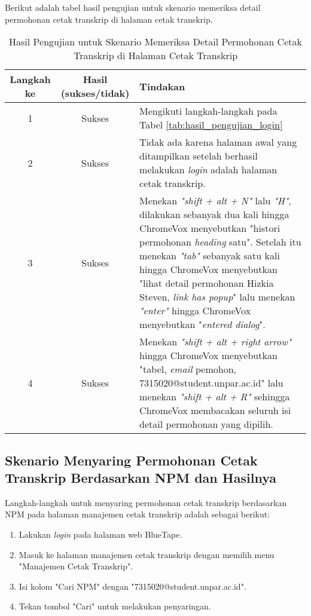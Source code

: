 Berikut adalah tabel hasil pengujian untuk skenario memeriksa detail permohonan cetak transkrip di halaman cetak transkrip.

\begin{table}[H]
    \centering 
    \caption{Hasil Pengujian untuk Skenario Memeriksa Detail Permohonan Cetak Transkrip di Halaman Cetak Transkrip}
    \label{tab:hasil_pengujian_memeriksa_detail_permohonan_cetak_transkrip_di_halaman_cetak_transkrip}
    \begin{tabular}{|c|c|p{10cm}|}
        \toprule
        Langkah ke & Hasil (sukses/tidak) & Tindakan \\

        \midrule
        1 & Sukses & Mengikuti langkah-langkah pada Tabel \ref{tab:hasil_pengujian_login} \\
        2 & Sukses & Tidak ada karena halaman awal yang ditampilkan setelah berhasil melakukan \textit{login} adalah halaman cetak transkrip. \\
        3 & Sukses & Menekan \textit{"shift + alt + N"} lalu \textit{"H"}, dilakukan sebanyak dua kali hingga ChromeVox menyebutkan "histori permohonan \textit{heading} satu". Setelah itu menekan \textit{"tab"} sebanyak satu kali hingga ChromeVox menyebutkan "lihat detail permohonan Hizkia Steven, \textit{link has popup}" lalu menekan \textit{"enter"} hingga ChromeVox menyebutkan "\textit{entered dialog}". \\
        4 & Sukses & Menekan \textit{"shift + alt + right arrow"} hingga ChromeVox menyebutkan "tabel, \textit{email} pemohon, 7315020@student.unpar.ac.id" lalu menekan \textit{"shift + alt + R"} sehingga ChromeVox membacakan seluruh isi detail permohonan yang dipilih. \\

        \bottomrule

    \end{tabular}
\end{table}

\subsection{Skenario Menyaring Permohonan Cetak Transkrip Berdasarkan NPM dan Hasilnya}
\label{subsec:skenario_menyaring_permohonan_cetak_transkrip_berdasarkan_npm}
Langkah-langkah untuk menyaring permohonan cetak transkrip berdasarkan NPM pada halaman manajemen cetak transkrip adalah sebagai berikut:

\begin{enumerate}
    \item Lakukan \textit{login} pada halaman web BlueTape.
    \item Masuk ke halaman manajemen cetak transkrip dengan memilih menu "Manajemen Cetak Transkrip".
    \item Isi kolom "Cari NPM" dengan "7315020@student.unpar.ac.id".
    \item Tekan tombol "Cari" untuk melakukan penyaringan.
\end{enumerate}

